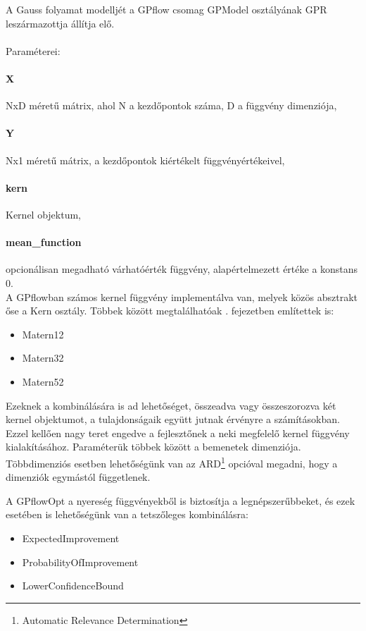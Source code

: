 A Gauss folyamat modelljét a GPflow csomag GPModel osztályának GPR leszármazottja állítja elő.\\\\
Paraméterei:
\paragraph{X} NxD méretű mátrix, ahol N a kezdőpontok száma, D a függvény dimenziója,\\
\paragraph{Y} Nx1 méretű mátrix, a kezdőpontok kiértékelt függvényértékeivel,\\
\paragraph{kern} Kernel objektum,\\
\paragraph{mean\_function} opcionálisan megadható várhatóérték függvény, alapértelmezett értéke a konstans 0.\\

A GPflowban számos kernel függvény implementálva van, melyek közös absztrakt őse a Kern osztály. Többek között megtalálhatóak . fejezetben említettek is:
\begin{itemize}
	\item Matern12
	\item Matern32
	\item Matern52
\end{itemize} 

Ezeknek a kombinálására is ad lehetőséget, összeadva vagy összeszorozva két kernel objektumot, a tulajdonságaik együtt jutnak érvényre a számításokban. Ezzel kellően nagy teret engedve a fejlesztőnek a neki megfelelő kernel függvény kialakításához. Paraméterük többek között a bemenetek dimenziója. Többdimenziós esetben lehetőségünk van az ARD\footnote{Automatic Relevance Determination} opcióval megadni, hogy a dimenziók egymástól függetlenek.

A GPflowOpt a nyereség függvényekből is biztosítja a legnépszerűbbeket, és ezek esetében is lehetőségünk van a tetszőleges kombinálásra:
\begin{itemize}
	\item ExpectedImprovement
	\item ProbabilityOfImprovement
	\item LowerConfidenceBound
\end{itemize}

